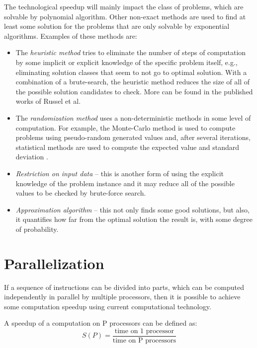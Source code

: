 The technological speedup will mainly impact the class of problems, which are solvable by polynomial algorithm. Other non-exact methods are used to find at least some solution for the problems that are only solvable by exponential algorithms. Examples of these methods are: 
\begin{itemize}
\item{The \emph{heuristic method} tries to eliminate the number of steps of computation by some implicit or explicit knowledge of the specific problem itself, e.g., eliminating solution classes that seem to not go to optimal solution. With a combination of a brute-search, the heuristic method reduces the size of all of the possible solution candidates to check. More can be found in the published works of Russel et al. \cite{Russell2009}}
\item{The \emph{randomization method} uses a non-deterministic methods in some level of computation. For example, the Monte-Carlo method is used to compute problems using pseudo-random generated values and, after several iterations, statistical methods are used to compute the expected value and standard deviation \cite{Manly2007}. }
\item{\emph{Restriction on input data} -- this is another form of using the explicit knowledge of the problem instance and it may reduce all of the possible values to be checked by brute-force search. }
\item{\emph{Approximation algorithm} -- this not only finds some good solutions, but also, it quantifies how far from the optimal solution the result is, with some degree of probability.}
\end{itemize}

\section{Parallelization}
\label{sec:introparalel}

If a sequence of instructions can be divided into parts, which can be computed independently in parallel by multiple processors, then it is possible to achieve some computation speedup using current computational technology. %

A speedup of a computation on P processors can be defined as:
\begin{equation}\label{eq:speedup}
 S(P) = \frac{\text{time on 1 processor}}{\text{time on P processors}}
 \end{equation}

